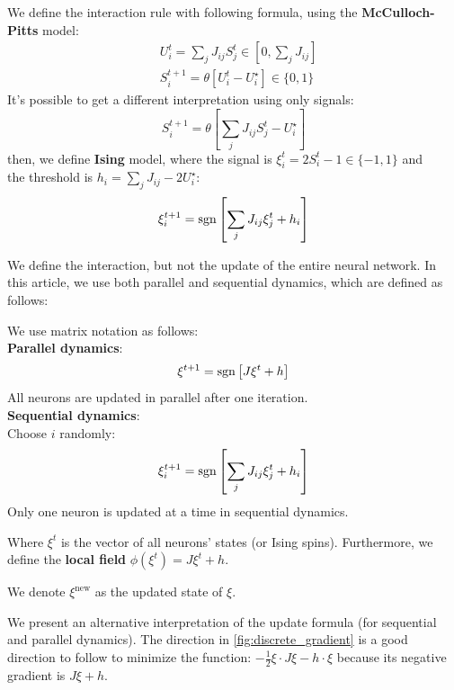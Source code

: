 \begin{definition}[interaction] We define the interaction rule with following formula, using the \textbf{McCulloch-Pitts} model:
    \begin{align}
        & U_i^t = \sum_j J_{ij}S_j^t \in \left[0, \sum_j J_{ij}\right]\\
        & S_i^{t+1} = \theta \left[U_i^t - U_i^\star\right] \in \{0,1\}
    \end{align}
    It's possible to get a different interpretation using only signals:
    \[
        S_i^{t+1} = \theta \left[\sum_j J_{ij}S_j^t - U_i^\star\right]
    \]
    then, we define \textbf{Ising} model, where the signal is $\xi_i^t = 2S_i^t-1\in\{-1,1\}$ and \\
    the threshold is $h_i = \sum_j J_{ij} - 2U_i^\star$:
    \begin{equation}
        \xi_i^{t+1} = \operatorname{sgn} \left[\sum_j J_{ij}\xi_j^{t} + h_i\right]
    \end{equation}
\end{definition}

\bigskip\noindent We define the interaction, but not the update of the entire neural network. In this article, we use both parallel and sequential dynamics, which are defined as follows:
\begin{definition}[updating] \label{def:discupdating} We use matrix notation as follows:\\
\textbf{Parallel dynamics}:
    \[
        \xi^{t+1} = \operatorname{sgn}\left[J\xi^t+h\right]
    \]
     All neurons are updated in parallel after one iteration.\\
\textbf{Sequential dynamics}:\\
Choose $i$ randomly:
     \[
        \xi_i^{t+1} = \operatorname{sgn} \left[\sum_j J_{ij}\xi_j^{t} + h_i\right]
    \]
    Only one neuron is updated at a time in sequential dynamics.

    \bigskip \noindent Where $\xi^t$ is the vector of all neurons' states (or Ising spins). Furthermore, we define the \textbf{local field} $\phi\left(\xi^t\right) = J\xi^t+h$.

    \noindent We denote $\xi^{\text{new}}$ as the updated state of $\xi$.
\end{definition}

\begin{remark}
    We present an alternative interpretation of the update formula (for sequential and parallel dynamics). The direction in \cref{fig:discrete_gradient} is a good direction to follow to minimize the function: $-\frac12\xi\cdot J\xi - h\cdot\xi$ because its negative gradient is $J\xi+h$.
\end{remark}

